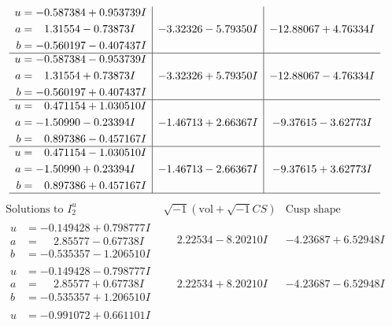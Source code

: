 \documentclass[1p]{elsarticle_modified}
\theoremstyle{definition}
\newcommand{\I}{\sqrt{-1}}
\begin{document}
$$\begin{array}{c|c|c}
\begin{aligned}
u &= -0.587384 + 0.953739 I \\
a &= \phantom{-}1.31554 - 0.73873 I \\
b &= -0.560197 - 0.407437 I\end{aligned}
 & -3.32326 - 5.79350 I & -12.88067 + 4.76334 I \\ \hline\begin{aligned}
u &= -0.587384 - 0.953739 I \\
a &= \phantom{-}1.31554 + 0.73873 I \\
b &= -0.560197 + 0.407437 I\end{aligned}
 & -3.32326 + 5.79350 I & -12.88067 - 4.76334 I \\ \hline\begin{aligned}
u &= \phantom{-}0.471154 + 1.030510 I \\
a &= -1.50990 - 0.23394 I \\
b &= \phantom{-}0.897386 - 0.457167 I\end{aligned}
 & -1.46713 + 2.66367 I & -9.37615 - 3.62773 I \\ \hline\begin{aligned}
u &= \phantom{-}0.471154 - 1.030510 I \\
a &= -1.50990 + 0.23394 I \\
b &= \phantom{-}0.897386 + 0.457167 I\end{aligned}
 & -1.46713 - 2.66367 I & -9.37615 + 3.62773 I\\
 \hline 
 \end{array}$$\newpage$$\begin{array}{c|c|c}  
\text{Solutions to }I^u_{2}& \I (\text{vol} + \sqrt{-1}CS) & \text{Cusp shape}\\
 \hline 
\begin{aligned}
u &= -0.149428 + 0.798777 I \\
a &= \phantom{-}2.85577 - 0.67738 I \\
b &= -0.535357 - 1.206510 I\end{aligned}
 & \phantom{-}2.22534 - 8.20210 I & -4.23687 + 6.52948 I \\ \hline\begin{aligned}
u &= -0.149428 - 0.798777 I \\
a &= \phantom{-}2.85577 + 0.67738 I \\
b &= -0.535357 + 1.206510 I\end{aligned}
 & \phantom{-}2.22534 + 8.20210 I & -4.23687 - 6.52948 I \\ \hline\begin{aligned}
u &= -0.991072 + 0.661101 I \\

\end{aligned}
\end{array}$$
\end{document}
